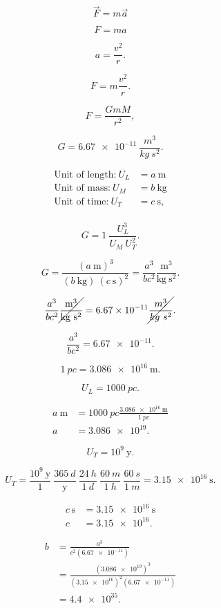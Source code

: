 \documentclass[a4paper,twoside,12pt,hidelinks]{article}
\begin{document}
\thispagestyle{empty}

\[
    \vec{F} = m \vec{a}
\]

\[
    F = m a
\]

\[
    a = \frac{v^2}{r}.
\]

\[
    F = m \frac{v^2}{r}.
\]

\[
F = \frac{G m M}{r^2},
\]

\[
G = \SI{6.67e-11}{\frac{m^{3}}{kg \ s^{2}}}.
\]

\begin{align*}
    \text{Unit of length:} \ U_L &= a \ \text{m} \\
    \text{Unit of mass:} \ U_M &= b \ \text{kg} \\
    \text{Unit of time:} \ U_T &= c \ \text{s}, \\
\end{align*}

\[
G = \SI{1}{\frac{U_L^3}{U_M \ U_T^{2}}}.
\]


\[
G = \frac{(a \ \text{m})^3}{(b \ \text{kg}) \ (c \ \text{s})^{2}} = \frac{a^3}{b c^2} \frac{\text{m}^3}{\text{kg} \ \text{s}^2}.
\]

\[
\frac{a^3}{b c^2} \cancel{\frac{\text{m}^3}{\text{kg} \ \text{s}^2}} = \num{6.67e-11} \cancel{\frac{m^{3}}{kg \ s^{2}}}.
\]

\[
\frac{a^3}{b c^2} = \num{6.67e-11}.
\]

\[
\SI{1}{pc} = \SI{3.086e16}{\m}.
\]

\[
U_L = \SI{1000}{pc}.
\]

\begin{align}
    a \ \text{m} &= \SI{1000}{pc} \frac{\SI{3.086e16}{\m}}{\SI{1}{pc}} \\
    a &= \num{3.086e19}.
\end{align}

\[
U_T = 10^9 \ \text{y}.
\]

\[
U_T = \frac{10^9 \ \text{y}}{1} \ \frac{\SI{365}{d}}{\text{y}} \ \frac{\SI{24}{h}}{\SI{1}{d}} \ \frac{\SI{60}{m}}{\SI{1}{h}} \ \frac{\SI{60}{s}}{\SI{1}{m}} = \SI{3.15e16}{\s}.
\]

\begin{align*}
    c \ \text{s} &= \SI{3.15e16}{\s} \\
    c &= \num{3.15e16}.
\end{align*}

\begin{align*}
    b &= \frac{a^3}{c^2 (\num{6.67e-11})}  \\
        &= \frac{(\num{3.086e19})^3}{(\num{3.15e16})^2 (\num{6.67e-11})}  \\
        &= \num{4.4e35}.
\end{align*}
\end{document}
